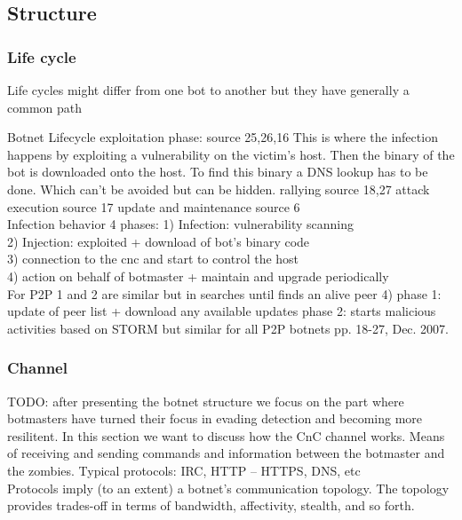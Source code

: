 \subsection{Structure}
\subsubsection{Life cycle}
Life cycles might differ from one bot to another but they have generally a common path


Botnet Lifecycle
exploitation phase: source 25,26,16
This is where the infection happens by exploiting a
vulnerability on the victim's host. Then the binary of the bot is downloaded onto the host. To find
this binary a DNS lookup has to be done. Which can't be avoided but can be hidden.
rallying source 18,27
attack execution source 17
update and maintenance source 6\\
Infection behavior 4 phases: 
1) Infection: vulnerability scanning \\
2) Injection: exploited + download of bot's binary code\\ 
3) connection to the cnc and start to control the host\\
4) action on behalf of botmaster + maintain and upgrade periodically\\
For P2P 1 and 2 are similar but in 
searches until finds an alive peer 4) phase 1: update of peer list + download any available updates phase 2: starts malicious activities
based on STORM but similar for all P2P botnets 
pp. 18-27, Dec. 2007.

\subsubsection{Channel}
TODO: after presenting the botnet structure we focus on the part where botmasters have turned their focus in evading detection and becoming more resilitent. In this section we want to discuss how the CnC channel works.
Means of receiving and sending commands and information between the botmaster and the zombies. Typical protocols: IRC, HTTP – HTTPS, DNS, etc\\
Protocols imply (to an extent) a botnet’s communication topology.
        The topology provides trades-off in terms of bandwidth, affectivity, stealth, and so forth.
        
